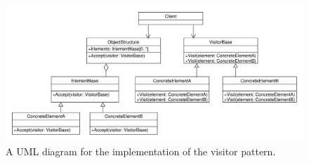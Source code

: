 \begin{figure}[!ht]
\centering
 \includegraphics[width=1\textwidth]{figures/ClassDiagrams/VisitorPattern.pdf} %
\caption{A UML diagram for the implementation of the visitor pattern.}\label{image:visitor}
\vspace{-15pt}
\end{figure}


